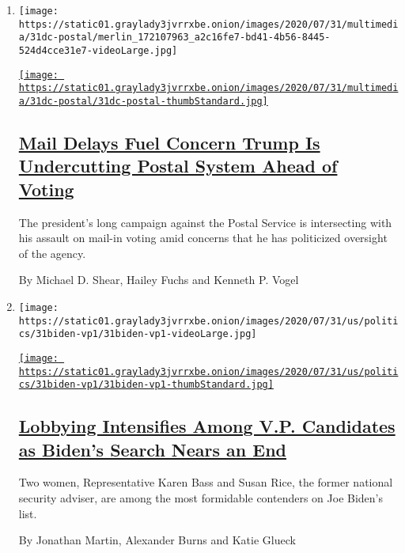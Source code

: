 \begin{enumerate}
\def\labelenumi{\arabic{enumi}.}
\item
  \texttt{[image: https://static01.graylady3jvrrxbe.onion/images/2020/07/31/multimedia/31dc-postal/merlin\_172107963\_a2c16fe7-bd41-4b56-8445-524d4cce31e7-videoLarge.jpg]}

  \href{/2020/07/31/us/politics/trump-usps-mail-delays.html}{\texttt{[image: https://static01.graylady3jvrrxbe.onion/images/2020/07/31/multimedia/31dc-postal/31dc-postal-thumbStandard.jpg]}}

  \hypertarget{mail-delays-fuel-concern-trump-is-undercutting-postal-system-ahead-of-voting}{%
  \subsection{\texorpdfstring{\href{/2020/07/31/us/politics/trump-usps-mail-delays.html}{Mail
  Delays Fuel Concern Trump Is Undercutting Postal System Ahead of
  Voting}}{Mail Delays Fuel Concern Trump Is Undercutting Postal System Ahead of Voting}}\label{mail-delays-fuel-concern-trump-is-undercutting-postal-system-ahead-of-voting}}

  The president's long campaign against the Postal Service is
  intersecting with his assault on mail-in voting amid concerns that he
  has politicized oversight of the agency.

  By Michael D. Shear, Hailey Fuchs and Kenneth P. Vogel
\item
  \texttt{[image: https://static01.graylady3jvrrxbe.onion/images/2020/07/31/us/politics/31biden-vp1/31biden-vp1-videoLarge.jpg]}

  \href{/2020/07/31/us/politics/joseph-biden-vice-president.html}{\texttt{[image: https://static01.graylady3jvrrxbe.onion/images/2020/07/31/us/politics/31biden-vp1/31biden-vp1-thumbStandard.jpg]}}

  \hypertarget{lobbying-intensifies-among-vp-candidates-as-bidens-search-nears-an-end}{%
  \subsection{\texorpdfstring{\href{/2020/07/31/us/politics/joseph-biden-vice-president.html}{Lobbying
  Intensifies Among V.P. Candidates as Biden's Search Nears an
  End}}{Lobbying Intensifies Among V.P. Candidates as Biden's Search Nears an End}}\label{lobbying-intensifies-among-vp-candidates-as-bidens-search-nears-an-end}}

  Two women, Representative Karen Bass and Susan Rice, the former
  national security adviser, are among the most formidable contenders on
  Joe Biden's list.

  By Jonathan Martin, Alexander Burns and Katie Glueck
\end{enumerate}

